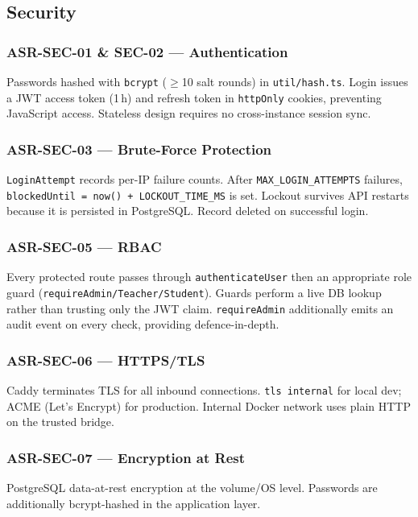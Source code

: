 \documentclass[12pt,a4paper]{article}
\begin{document}
\subsection{Security}

\subsubsection{ASR-SEC-01 \& SEC-02 --- Authentication}
Passwords hashed with \texttt{bcrypt} ($\geq$10 salt rounds) in \texttt{util/hash.ts}.
Login issues a JWT access token (1\,h) and refresh token in \texttt{httpOnly} cookies,
preventing JavaScript access.  Stateless design requires no cross-instance session sync.

\subsubsection{ASR-SEC-03 --- Brute-Force Protection}
\texttt{LoginAttempt} records per-IP failure counts.  After \texttt{MAX\_LOGIN\_ATTEMPTS}
failures, \texttt{blockedUntil = now() + LOCKOUT\_TIME\_MS} is set.  Lockout survives
API restarts because it is persisted in PostgreSQL.  Record deleted on successful login.

\subsubsection{ASR-SEC-05 --- RBAC}
Every protected route passes through \texttt{authenticateUser} then an appropriate role
guard (\texttt{requireAdmin/Teacher/Student}).  Guards perform a live DB lookup rather than
trusting only the JWT claim.  \texttt{requireAdmin} additionally emits an audit event on
every check, providing defence-in-depth.

\subsubsection{ASR-SEC-06 --- HTTPS/TLS}
Caddy terminates TLS for all inbound connections.  \texttt{tls internal} for local dev;
ACME (Let's Encrypt) for production.  Internal Docker network uses plain HTTP on the
trusted bridge.

\subsubsection{ASR-SEC-07 --- Encryption at Rest}
PostgreSQL data-at-rest encryption at the volume/OS level.  Passwords are additionally
bcrypt-hashed in the application layer.
\end{document}

